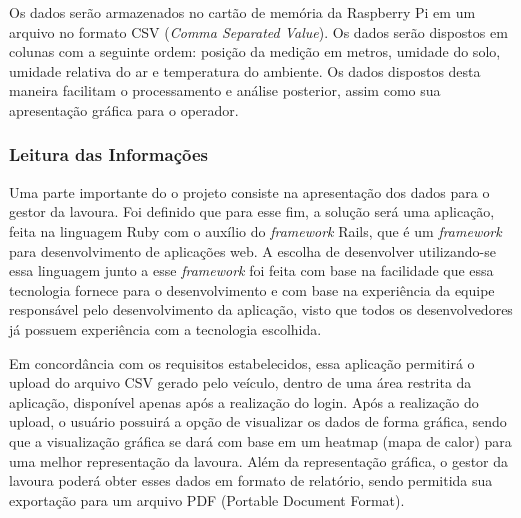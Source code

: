   Os dados serão armazenados no cartão de memória da Raspberry Pi
  em um arquivo no formato CSV (\textit{Comma Separated Value}). Os dados
  serão dispostos em colunas com a seguinte ordem: posição da medição
  em metros, umidade do solo, umidade relativa do ar e temperatura do
  ambiente.
  Os dados dispostos desta maneira facilitam o processamento e
  análise posterior, assim como sua apresentação gráfica para
  o operador.

  \subsubsection{Leitura das Informações}

  Uma parte importante do o projeto consiste na apresentação dos
  dados para o gestor da lavoura. Foi definido que para esse fim,
  a solução será uma aplicação, feita na linguagem Ruby com o
  auxílio do \textit{framework} Rails, que é um \textit{framework}
  para desenvolvimento de aplicações web.
  A escolha de desenvolver utilizando-se essa linguagem junto a
  esse \textit{framework} foi feita com base na facilidade que essa
  tecnologia fornece para o desenvolvimento e com base na experiência
  da equipe responsável pelo desenvolvimento da aplicação, visto que
  todos os desenvolvedores já possuem experiência com a tecnologia
  escolhida.

  Em concordância com os requisitos estabelecidos, essa aplicação
  permitirá o upload do arquivo CSV gerado pelo veículo, dentro de
  uma área restrita da aplicação, disponível apenas após a realização
  do login.
  Após a realização do upload, o usuário possuirá a opção de visualizar
  os dados de forma gráfica, sendo que a visualização gráfica se dará
  com base em um heatmap (mapa de calor) para uma melhor representação
  da lavoura.
  Além da representação gráfica, o gestor da lavoura poderá obter
  esses dados em formato de relatório, sendo permitida sua
  exportação para um arquivo PDF (Portable Document Format).
